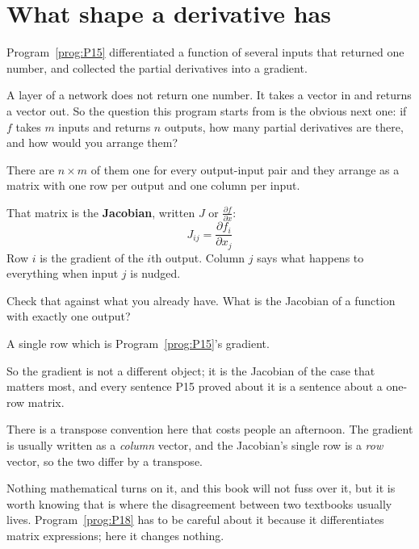 \section{What shape a derivative has}
\label{sec:P16-jacobian}

\begin{fr}
Program~\ref{prog:P15} differentiated a function of several inputs that
returned one number, and collected the partial derivatives into a gradient.

A layer of a network does not return one number. It takes a vector in and
returns a vector out. So the question this program starts from is the obvious
next one: if $f$ takes $m$ inputs and returns $n$ outputs, how many partial
derivatives are there, and how would you arrange them?
\dotline
\nextframe
\end{fr}

\begin{fr}
\begin{ansblock}
There are $n \times m$ of them \dash{} one for every output-input pair
\dash{} and they arrange as a matrix with one row per output and one column
per input.
\end{ansblock}

That matrix is the \textbf{Jacobian}, written $J$ or
$\frac{\partial f}{\partial x}$:
\[ J_{ij} = \frac{\partial f_i}{\partial x_j} \]
Row $i$ is the gradient of the $i$th output. Column $j$ says what happens to
everything when input $j$ is nudged.

\end{fr}

\begin{fr}
Check that against what you already have. What is the Jacobian of a function
with exactly one output?
\nextframe
\end{fr}

\begin{fr}
\begin{ansblock}
A single row \dash{} which is Program~\ref{prog:P15}'s gradient.
\end{ansblock}

So the gradient is not a different object; it is the Jacobian of the case that
matters most, and every sentence P15 proved about it is a sentence about a
one-row matrix.

\begin{note}
There is a transpose convention here that costs people an afternoon. The
gradient is usually written as a \emph{column} vector, and the Jacobian's
single row is a \emph{row} vector, so the two differ by a transpose.

Nothing mathematical turns on it, and this book will not fuss over it, but it
is worth knowing that is where the disagreement between two textbooks usually
lives. Program~\ref{prog:P18} has to be careful about it because it
differentiates matrix expressions; here it changes nothing.
\end{note}
\end{fr}

